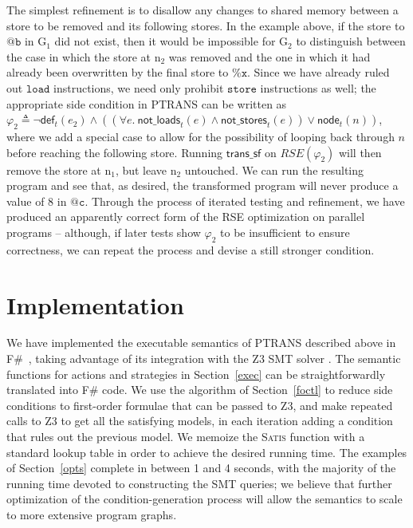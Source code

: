 \documentclass{eptcs}
\newcommand{\ptrans}[0]{PTRANS}
\begin{document}
The simplest refinement is to disallow any changes to shared memory between a store to be removed and its following stores. In the example above, if the store to $\mathtt{@b}$ in $\mathrm{G_1}$ did not exist, then it would be impossible for $\mathrm{G_2}$ to distinguish between the case in which the store at $\mathrm{n_2}$ was removed and the one in which it had already been overwritten by the final store to $\mathtt{\%x}$. Since we have already ruled out $\mathtt{load}$ instructions, we need only prohibit $\mathtt{store}$ instructions as well; the appropriate side condition in {\ptrans} can be written as $\varphi_2 \triangleq \neg\mathsf{def}_t(e_2) \land ((\forall e.\ \mathsf{not\_loads}_t(e) \land \mathsf{not\_stores}_t(e)) \lor \mathsf{node}_t(n))$, where we add a special case to allow for the possibility of looping back through $n$ before reaching the following store. Running $\mathsf{trans\_sf}$ on $\mathit{RSE}(\varphi_2)$ will then remove the store at $\mathrm{n_1}$, but leave $\mathrm{n_2}$ untouched. We can run the resulting program and see that, as desired, the transformed program will never produce a value of 8 in $\mathtt{@c}$. Through the process of iterated testing and refinement, we have produced an apparently correct form of the RSE optimization on parallel programs -- although, if later tests show $\varphi_2$ to be insufficient to ensure correctness, we can repeat the process and devise a still stronger condition.

\section{Implementation}
\label{impl}
We have implemented the executable semantics of {\ptrans} described above in F\#~\cite{fsharp}, taking advantage of its integration with the Z3 SMT solver \cite{z3}. The semantic functions for actions and strategies in Section~\ref{exec} can be straightforwardly translated into F\# code. We use the algorithm of Section~\ref{foctl} to reduce side conditions to first-order formulae that can be passed to Z3, and make repeated calls to Z3 to get all the satisfying models, in each iteration adding a condition that rules out the previous model. We memoize the \textsc{Satis} function with a standard lookup table in order to achieve the desired running time. The examples of Section~\ref{opts} complete in between 1 and 4 seconds, with the majority of the running time devoted to constructing the SMT queries; we believe that further optimization of the condition-generation process will allow the semantics to scale to more extensive program graphs.
\end{document}
